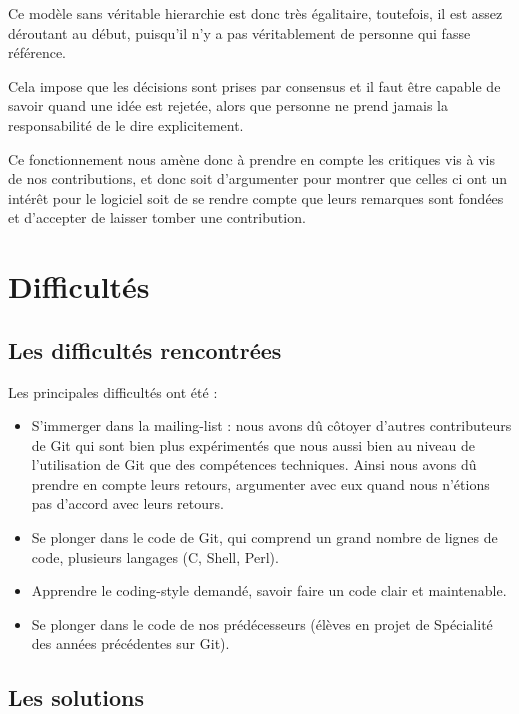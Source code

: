 \documentclass[a4paper, 12pt]{article}
\begin{document}
Ce modèle sans véritable hierarchie est donc très égalitaire, toutefois, il est assez déroutant au début, puisqu'il n'y a pas véritablement de personne qui fasse référence.

Cela impose que les décisions sont prises par consensus et il faut être capable de savoir quand une idée est rejetée, alors que personne ne prend jamais la responsabilité de le dire explicitement.

Ce fonctionnement nous amène donc à prendre en compte les critiques vis à vis de nos contributions, et donc soit d'argumenter pour montrer que celles ci ont un intérêt pour le logiciel soit de se rendre compte que leurs remarques sont fondées et d'accepter de laisser tomber une contribution.

\section{Difficultés}

\subsection{Les difficultés rencontrées}

Les principales difficultés ont été :
\begin{itemize}

\item S'immerger dans la mailing-list : nous avons dû côtoyer d'autres contributeurs de Git qui sont bien plus expérimentés que nous aussi bien au niveau de l'utilisation de Git que des compétences techniques. Ainsi nous avons dû prendre en compte leurs retours, argumenter avec eux quand nous n'étions pas d'accord avec leurs retours.
\item Se plonger dans le code de Git, qui comprend un grand nombre de lignes de code, plusieurs langages (C, Shell, Perl).
\item Apprendre le coding-style demandé, savoir faire un code clair et maintenable.
\item Se plonger dans le code de nos prédécesseurs (élèves en projet de Spécialité des années précédentes sur Git).

\end{itemize}

\subsection{Les solutions}
\end{document}
